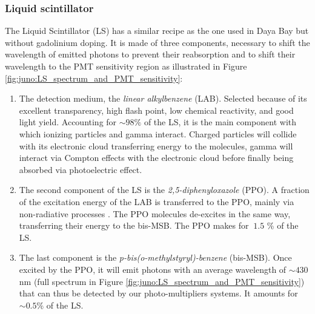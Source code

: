 \documentclass[../main.tex]{subfiles}
\begin{document}
\subsubsection{Liquid scintillator}
\label{sec:juno:LS}

The Liquid Scintillator (LS) has a similar recipe as the one used in Daya Bay \cite{bay_optimization_2020} but without gadolinium doping. It is made of three components, necessary to shift the wavelength of emitted photons to prevent their reabsorption and to shift their wavelength to the PMT sensitivity region as illustrated in Figure \ref{fig:juno:LS_spectrum_and_PMT_sensitivity}:
\begin{enumerate}
  \item The detection medium, the \textit{linear alkylbenzene} (LAB). Selected because of its excellent transparency, high flash point, low chemical reactivity, and good light yield. Accounting for $\sim 98\%$ of the LS, it is the main component with which ionizing particles and gamma interact. Charged particles will collide with its electronic cloud transferring energy to the molecules, gamma will interact via Compton effects with the electronic cloud before finally being absorbed via photoelectric effect.
  \item The second component of the LS is the \textit{2,5-diphenyloxazole} (PPO). A fraction of the excitation energy of the LAB is transferred to the PPO, mainly via non-radiative processes \cite{birks_chapter_1964}. The PPO molecules de-excites in the same way, transferring their energy to the bis-MSB. The PPO makes for $~1.5$ \% of the LS.
  \item The last component is the \textit{p-bis(o-methylstyryl)-benzene} (bis-MSB). Once excited by the PPO, it will emit photons with an average wavelength of $\sim430$ nm (full spectrum in Figure \ref{fig:juno:LS_spectrum_and_PMT_sensitivity}) that can thus be detected by our photo-multipliers systems. It amounts for $\sim 0.5$\% of the LS.
\end{enumerate}
\end{document}
